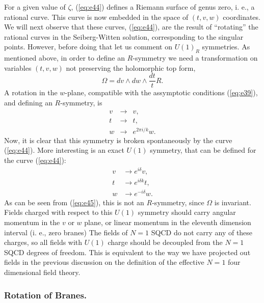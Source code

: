 For a given value of $\zeta$, (\ref{eq:e44}) defines a Riemann
surface of genus zero, i. e., a rational curve. This curve is now
embedded in the space of $(t,v,w)$ coordinates. We will next
observe that these curves, (\ref{eq:e44}), are the result of
``rotating'' \cite{Barbon} the rational curves in the Seiberg-Witten solution,
corresponding to the singular points. However, before doing that
let us comment on $U(1)_R$ symmetries. As mentioned above, in
order to define an $R$-symmetry we need a transformation on
variables $(t,v,w)$ not preserving the holomorphic top form,
\begin{equation}
\Omega = dv \wedge dw \wedge \frac {dt}{t} R.
\label{eq:e45}
\end{equation}
A rotation in the $w$-plane, compatible with the assymptotic
conditions (\ref{eq:e39}), and defining an
$R$-symmetry, is
\begin{eqnarray}
v & \rightarrow & v, \nonumber \\
t & \rightarrow & t, \nonumber \\
w & \rightarrow & e^{2 \pi i/k} w.
\label{eq:e46}
\end{eqnarray}
Now, it is clear that this symmetry is broken spontaneously by
the curve (\ref{eq:e44}). More interesting is an exact $U(1)$
symmetry, that can be defined for the curve (\ref{eq:e44}):
\begin{eqnarray}
v & \rightarrow e^{i \delta} v, \nonumber \\
t & \rightarrow e^{i \delta k} t, \nonumber \\
w & \rightarrow e^{-i \delta} w.
\label{eq:e47}
\end{eqnarray}
As can be seen from (\ref{eq:e45}), this is not an $R$-symmetry,
since $\Omega$ is invariant. Fields charged with respect to this
$U(1)$ symmetry should carry angular momentum in the $v$ or $w$
plane, or linear momentum in the eleventh dimension interval (i.
e., zero branes) The fields of $N=1$ SQCD do not carry any of
these charges, so all fields with $U(1)$ charge should be
decoupled from the $N=1$ SQCD degrees of freedom. This is
equivalent to the way we have projected out fields in the
previous discussion on the definition of the effective $N=1$ four
dimensional field theory.
  
\subsubsection{Rotation of Branes.}

